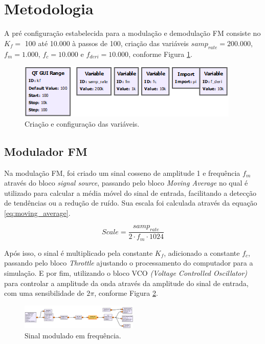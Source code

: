 \section{Metodologia}
A pré configuração estabelecida para a modulação e demodulação FM consiste no $K_{f} =$ 100 até 10.000 à passos de 100, criação das variáveis $samp_{rate} = 200.000$, $f_{m} = 1.000$, $f_{c} = 10.000$ e $f_{deri} = 10.000$, conforme Figura \ref{fig:pre_config}.

\begin{figure}[!htb]
    \centering
    \includegraphics[scale=0.7]{Imagens/pre configuracao.PNG}
    \caption{Criação e configuração das variáveis.}
    \label{fig:pre_config}
\end{figure}


\subsection{Modulador FM}
Na modulação FM, foi criado um sinal cosseno de amplitude 1 e frequência $f_{m}$ através do bloco \textit{signal source}, passando pelo bloco \textit{Moving Average} no qual é utilizado para calcular a média móvel do sinal de entrada, facilitando a detecção de tendências ou a redução de ruído.
Sua escala foi calculada através da equação \ref{eq:moving_average}.

\begin{equation}
   Scale =  \frac{samp_{rate}}{2 \cdot f_{m} \cdot 1024}
   \label{eq:moving_average}
\end{equation}

Após isso, o sinal é multiplicado pela constante $K_{f}$, adicionado a constante $f_{c}$, passando pelo bloco \textit{Throttle} ajustando o processamento do computador para a simulação. E por fim, utilizando o bloco VCO \textit{(Voltage Controlled Oscillator)} para controlar a amplitude da onda através da amplitude do sinal de entrada, com uma sensibilidade de $2\pi$, conforme Figura \ref{fig:modulacao}.

\begin{figure}[!htb]
    \centering
    \includegraphics[width=0.5\textwidth]{Imagens/Modulacao_FM.PNG}
    \caption{Sinal modulado em frequência.}
    \label{fig:modulacao}
\end{figure}

